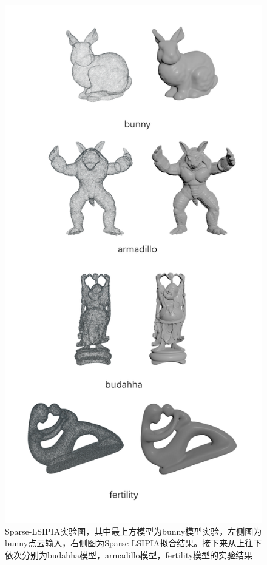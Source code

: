 \begin{figure}[htbp]
    \centering
    \includegraphics[scale=0.7]{./images/LSIPIA_experience_long.png}
    \caption[Sparse-LSIPIA实验结果]{Sparse-LSIPIA实验图，其中最上方模型为bunny模型实验，左侧图为bunny点云输入，右侧图为Sparse-LSIPIA拟合结果。接下来从上往下依次分别为budahha模型，armadillo模型，fertility模型的实验结果}
    \label{fig: Sparse-LSIPIA_experience}
\end{figure}


